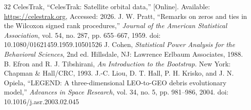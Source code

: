\documentclass[10pt,conference,a4paper]{IEEEtran}
\begin{document}
\begin{thebibliography}{32}
 CelesTrak, ``CelesTrak: Satellite orbital data,'' [Online]. Available: \url{https://celestrak.org}, Accessed: 2026.
 J. W. Pratt, ``Remarks on zeros and ties in the Wilcoxon signed rank procedures,'' \textit{Journal of the American Statistical Association}, vol. 54, no. 287, pp. 655--667, 1959. doi: 10.1080/01621459.1959.10501526
 J. Cohen, \textit{Statistical Power Analysis for the Behavioral Sciences}, 2nd ed. Hillsdale, NJ: Lawrence Erlbaum Associates, 1988.
 B. Efron and R. J. Tibshirani, \textit{An Introduction to the Bootstrap}. New York: Chapman \& Hall/CRC, 1993.
 J.-C. Liou, D. T. Hall, P. H. Krisko, and J. N. Opiela, ``LEGEND: A three-dimensional LEO-to-GEO debris evolutionary model,'' \textit{Advances in Space Research}, vol. 34, no. 5, pp. 981--986, 2004. doi: 10.1016/j.asr.2003.02.045
\end{thebibliography}
\end{document}
